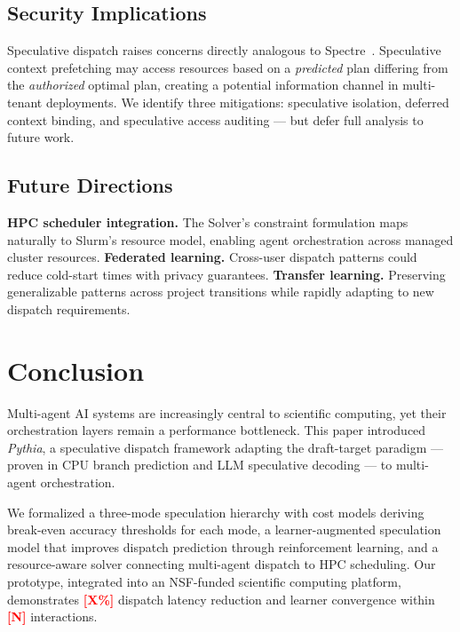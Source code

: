 \documentclass[conference,10pt]{IEEEtran}
\newcommand{\placeholder}[1]{\textcolor{red}{\textbf{[#1]}}}
\begin{document}
\subsection{Security Implications}

Speculative dispatch raises concerns directly analogous to Spectre~\cite{kocher2019spectre}.
Speculative context prefetching may access resources based on a \emph{predicted} plan differing from the \emph{authorized} optimal plan, creating a potential information channel in multi-tenant deployments.
We identify three mitigations: speculative isolation, deferred context binding, and speculative access auditing --- but defer full analysis to future work.

\subsection{Future Directions}

\textbf{HPC scheduler integration.} The Solver's constraint formulation maps naturally to Slurm's resource model, enabling agent orchestration across managed cluster resources.
\textbf{Federated learning.} Cross-user dispatch patterns could reduce cold-start times with privacy guarantees.
\textbf{Transfer learning.} Preserving generalizable patterns across project transitions while rapidly adapting to new dispatch requirements.



\section{Conclusion}
\label{sec:conclusion}

Multi-agent AI systems are increasingly central to scientific computing, yet their orchestration layers remain a performance bottleneck.
This paper introduced \emph{Pythia}, a speculative dispatch framework adapting the draft-target paradigm --- proven in CPU branch prediction and LLM speculative decoding --- to multi-agent orchestration.

We formalized a three-mode speculation hierarchy with cost models deriving break-even accuracy thresholds for each mode, a learner-augmented speculation model that improves dispatch prediction through reinforcement learning, and a resource-aware solver connecting multi-agent dispatch to HPC scheduling.
Our prototype, integrated into an NSF-funded scientific computing platform, demonstrates \placeholder{X\%} dispatch latency reduction and learner convergence within \placeholder{N} interactions.
\end{document}
